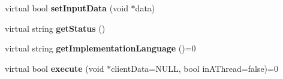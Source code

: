 \begin{DoxyCompactItemize}
\item 
\hypertarget{classrrp_1_1_plugin_af371e5f407e8325b046fd5bb4029429c}{virtual bool {\bfseries set\-Input\-Data} (void $\ast$data)}\label{classrrp_1_1_plugin_af371e5f407e8325b046fd5bb4029429c}

\item 
\hypertarget{classrrp_1_1_plugin_a98f764590f61833475a749b9e6ad825b}{virtual string {\bfseries get\-Status} ()}\label{classrrp_1_1_plugin_a98f764590f61833475a749b9e6ad825b}

\item 
\hypertarget{classrrp_1_1_plugin_a1c89d92714bd671b1a5b93d693d03b6d}{virtual string {\bfseries get\-Implementation\-Language} ()=0}\label{classrrp_1_1_plugin_a1c89d92714bd671b1a5b93d693d03b6d}

\item 
\hypertarget{classrrp_1_1_plugin_a4d7207ae4903b67e2226cafaed979be0}{virtual bool {\bfseries execute} (void $\ast$client\-Data=N\-U\-L\-L, bool in\-A\-Thread=false)=0}\label{classrrp_1_1_plugin_a4d7207ae4903b67e2226cafaed979be0}

\end{DoxyCompactItemize}
